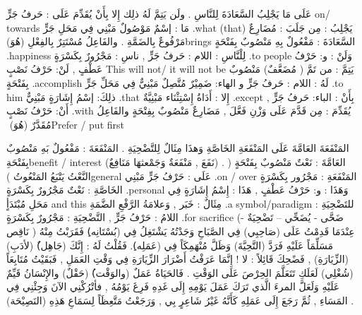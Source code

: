 \documentclass[a4paper]{article}
\begin{document}
\begin{flushright}
عَلَى مَا يَجْلِبُ السَّعَادَةَ لِلنَّاسِ . ولَن يَتِمَّ لَهُ ذلِك إِلا بِأَنْ يُقَدِّمَ
عَلَى : حَرفُ جَرٍّ on/ towards
مَا : إسْمٌ مَوْصُولٌ مَبْنِي فِي مَحَلِ جَرٍّ .what (that)
يَجْلِبُ : مِن جَلَبَ : مُضَارِعٌ مَرْفُوعٌ بِالضَمَّةِ . والفَاعِلُ مُسْتَتِرٌ بِالفِعْلِ (هُوَ)brings
السَّعَادَةَ : مَفْعُولٌ بِهِ مَنْصُوبٌ بِفَتْحَةٍ .happiness
لِلْنَّاسِ : اللام : حَرفُ جَرٍّ ,  ناسِ : مَجْرُورٌ بِكَسْرَةٍ .to people
وَلَنْ : و: حَرْفُ عَطْفٍ ,  لَنْ: حَرْفُ نَصْبٍ This will not/ it will not be
يَتِمَّ : من تَمَّ ( مُضَعَّفٌ) مَنْصُوبٌ بِفَتْحَةٍ .accomplish
لَهُ : اللام : حَرفُ جَرٍّ  و الهاء: ضَمِيْرٌ مُتَّصِلٌ مَبْنِيٌّ فِي مَحَلِّ جَرٍّ .to him
ذلِكَ: إسْمُ إِشَارَةٍ مَبْنِيٌّ .that
إِلا : أَدَاةُ إِسْتِثْنَاء مَبْنِيَّةٌ .except
بِأَنْ : الباء: حَرفُ جَرٍّ ,  أَنْ: حَرْفُ نَصْبٍ .with
يُقَدِّمَ : مِن قَدَّمَ عَلَى وَزْنِ فَعَّلَ , مَضَارِعٌ مَنْصُوبٌ بِفِتْحَةٍ والفَاعِلُ مُقَدَّرٌ (هُوَ)
‏Prefer / put first


المَنْفَعَةَ العَامَّةَ عَلَى المَنْفَعَةِ الخَاصَّةِ وَهذَا مِثَالٌ لِلتَّضْحِيَةِ .
 المَنْفَعَةَ : مَفْعُولٌ بَهِ مَنْصُوبٌ بِفَتْحَةِbenefit / interest
            (نَفَعَ , مَنْفَعَةٌ وَجَمْعثهَا مَنَافِعٌ) .
العَامَّةَ : نَعْتٌ مَنْصُوبٌ بِفَتْحَةٍ ( النَّعْتُ يَتْبَعُ المَنْعُوتُ )general
عَلَى : حَرْفُ جَرٍّ مَبْنِي .on / over
المَنْفَعَةِ : مَجْرُور بِكَسْرَةٍ
الخَاصَّةِ : نَعْتٌ مَجْرُورٌ بِكَسْرَةٍ .personal
وَهَذَا : و: حَرْفُ عَطْفٍ , هَذَا : إِسْمُ إِشَارَةٍ فِي مَحَلِ مُبْتَدَأٍ and this
مِثَالٌ : خَبَر , وَعلامَةُ الرَّفْعِ الضَّمَةِ .a symbol/paradigm
للتَضْحِيَةِ : اللامُ : حَرْفُ جَرٍّ , التَّضْحِيَةِ : مَجْرُورٌ بِكَسْرَةٍ .for sacrifice
(ضَحَّى - يُضَحِّي – تَضْحِيَةٌ - نَاقِص )
عِنْدَمَا قَدِمْتُ عَلَى (صَاحِبِي) فِي الصَّبَاحِ وَجَدْتُهُ يَشْتَغِلُ فِي
(بُسْتَانِه)ِ فَقَرَبْتُ مِنْهُ مَسَلِّمَاً عَلَيْهِ فَرَدَّ (التَّحِيَّةَ) وَظَلَّ مُنْهَمِكَاً فِي
(عَمَلِه)ِ. فَقُلْتُ لَهُ : إِنَّكَ (جَاهِل)ٌ (لأدَبِ) (الزِّيَارَةِ) , فَضًحِكَ
قَائِلاً : لا ! إِنَّمَا عَرَفْتُ أَضْرَارَ الزِّيَارَةِ فِي وَقْتِ العَمَلِ ,
فَبَقَيْتُ مُتَابِعَاً (شُغْلِي) لَعَلَكِ تَتَعَلَّمَ الحِرْصَ عَلَى الوَقْتِ . فَالحَيَاةُ
عَمَلٌ (والوَقْت)ُ (حَقْلٌ) والإِنْسَانُ قَيِّمٌ عَلَيْهِ وَلَعَلَّ المرءَ الَّذي
تَرَكَ عَمَلَ يَوْمِهِ إِلَى غَدِهِ فَرِغَ يَوْمُهُ , فأتْرُكْنِي الآنَ وَجِئْنِي فِي
المَسَاءِ , ثُمَّ رَجَعَ إِلَى عَمَلِهِ كَأَنَّهُ غَيْرُ شَاعِرٍ بِي , وَرَجَعْتُ
مَتَّعِظَاً لِسَمَاعِ هَذِهِ (النَصِيْحَة) .


\end{flushright}
\end{document}
